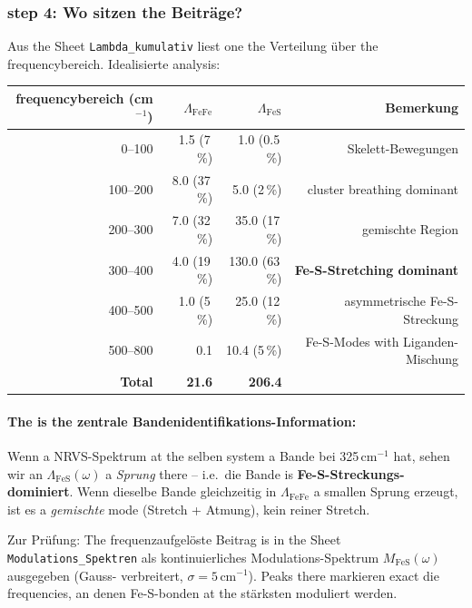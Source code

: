 \documentclass[11pt,a4paper,twoside]{article}
\theoremstyle{remark}
\begin{document}
\subsubsection*{step 4: Wo sitzen the Beitr\"age?}

Aus the Sheet \texttt{Lambda\_kumulativ} liest one the Verteilung
\"uber the frequencybereich. Idealisierte analysis:

\begin{center}
\begin{tabular}{rrrr}
  \toprule
  \textbf{frequencybereich (cm$^{-1}$)} & $\Lambda_\text{FeFe}$ & $\Lambda_\text{FeS}$ & \textbf{Bemerkung} \\
  \midrule
  0--100   & 1.5 (7\,\%) & 1.0 (0.5\,\%) & Skelett-Bewegungen \\
  100--200 & 8.0 (37\,\%) & 5.0 (2\,\%)  & cluster breathing dominant \\
  200--300 & 7.0 (32\,\%) & 35.0 (17\,\%) & gemischte Region \\
  300--400 & 4.0 (19\,\%) & 130.0 (63\,\%) & \textbf{Fe-S-Stretching dominant} \\
  400--500 & 1.0 (5\,\%) & 25.0 (12\,\%) & asymmetrische Fe-S-Streckung \\
  500--800 & 0.1         & 10.4 (5\,\%)   & Fe-S-Modes with Liganden-Mischung \\
  \midrule
  \textbf{Total} & \textbf{21.6} & \textbf{206.4} & \\
  \bottomrule
\end{tabular}
\end{center}

\paragraph{The is the zentrale Bandenidentifikations-Information:}
Wenn a NRVS-Spektrum at the selben system a Bande bei
325\,cm$^{-1}$ hat, sehen wir an
$\Lambda_\text{FeS}(\omega)$ a \emph{Sprung} there -- i.e.\ die
Bande is \textbf{Fe-S-Streckungs-dominiert}. Wenn dieselbe Bande
gleichzeitig in $\Lambda_\text{FeFe}$ a smallen Sprung erzeugt,
ist es a \emph{gemischte} mode (Stretch + Atmung), kein reiner
Stretch.

Zur Pr\"ufung: The frequenzaufgel\"oste Beitrag is in the Sheet
\texttt{Modulations\_Spektren} als kontinuierliches
Modulations-Spektrum $M_\text{FeS}(\omega)$ ausgegeben (Gauss-
verbreitert, $\sigma = 5\,$cm$^{-1}$). Peaks there markieren exact
die frequencies, an denen Fe-S-bonden at the st\"arksten moduliert
werden.
\end{document}
